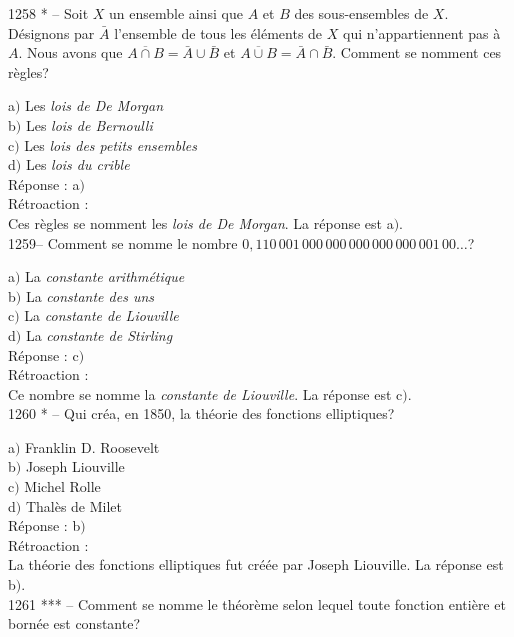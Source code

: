 ﻿\documentclass[letterpaper, 12pt]{article}
\begin{document}
1258 * -- Soit $X$ un ensemble ainsi que $A$ et $B$ des
sous-ensembles de $X$. D\'esignons par $\bar A$ l'ensemble de tous
les \'el\'ements de $X$ qui n'appartiennent pas \`a $A$. Nous avons
que $\overline{A\cap B}=\bar A\cup\bar B$ et $\overline{A\cup
B}=\bar A\cap\bar B$. Comment se nomment ces r\`egles?

a$)$ Les {\sl lois de De Morgan} \\
b$)$ Les {\sl lois de Bernoulli} \\
c$)$ Les {\sl lois des petits ensembles} \\
d$)$ Les {\sl lois du crible}\\

R\'eponse : a$)$\\

R\'etroaction : \\
Ces r\`egles se nomment les {\sl lois de De Morgan}.
La r\'eponse est a$)$.\\

1259-- Comment se nomme le nombre
$0,110\,001\,000\,000\,000\,000\,000\,001\,00\ldots$?

a$)$ La {\sl constante arithm\'etique} \\
b$)$ La {\sl constante des uns} \\
c$)$ La {\sl constante de Liouville} \\
d$)$ La {\sl constante de Stirling}\\

R\'eponse : c$)$\\

R\'etroaction : \\
Ce nombre se nomme la {\sl constante de Liouville}.
La r\'eponse est c$)$.\\

1260 * -- Qui cr\'ea, en 1850, la th\'eorie des fonctions
elliptiques?

a$)$ Franklin D. Roosevelt \\
b$)$ Joseph Liouville \\
c$)$ Michel Rolle \\
d$)$ Thal\`es de Milet\\

R\'eponse : b$)$\\

R\'etroaction : \\
La th\'eorie des fonctions elliptiques fut cr\'e\'ee par Joseph
Liouville.
La r\'eponse est b$)$.\\

1261 *** -- Comment se nomme le th\'eor\`eme selon lequel toute
fonction enti\`ere et born\'ee est constante?
\end{document}
